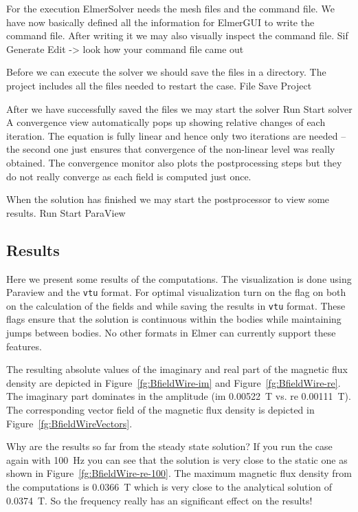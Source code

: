 For the execution 
ElmerSolver needs the mesh files and the command file. We have now basically defined
all the information for ElmerGUI to write the command file. After writing it we may also visually 
inspect the command file.
\ttbegin
Sif 
  Generate
  Edit -> look how your command file came out  
\ttend

Before we can execute the solver we should save the files in a directory. The project includes
all the files needed to restart the case.
\ttbegin
File 
  Save Project
\ttend

After we have successfully saved the files we may start the solver
\ttbegin
Run
  Start solver
\ttend
A convergence view automatically pops up showing relative changes of each iteration.
The equation is fully linear and hence only two iterations are needed -- the second 
one just ensures that convergence of the non-linear level was really obtained. 
The convergence monitor also plots the postprocessing steps but they do not really converge as each field is computed just once. 

When the solution has finished we may start the postprocessor to view some results.
\ttbegin
Run
  Start ParaView
\ttend


\subsection*{Results}

Here we present some results of the computations. The visualization is done using Paraview and the \texttt{vtu} format.
For optimal visualization turn on the \texttt{} flag on both on the calculation of the fields
and while saving the results in \texttt{vtu} format. 
These flags ensure that the solution is continuous within the bodies while maintaining jumps between bodies. 
No other formats in Elmer can currently support these features.

The resulting absolute values of the imaginary and real part of the magnetic flux density are depicted in
Figure~\ref{fg:BfieldWire-im} and Figure~\ref{fg:BfieldWire-re}. The imaginary part dominates in the amplitude (im 0.00522~T vs. re 0.00111~T). 
The corresponding vector field of the magnetic flux density is depicted in Figure~\ref{fg:BfieldWireVectors}.

Why are the results so far from the steady state solution? If you run the case again with 
100~Hz you can see that the solution is very close to the static one as shown in Figure~\ref{fg:BfieldWire-re-100}. The maximum magnetic flux density from the 
computations is 0.0366~T which is very close to the analytical solution of 0.0374~T. So the frequency
really has an significant effect on the results!

